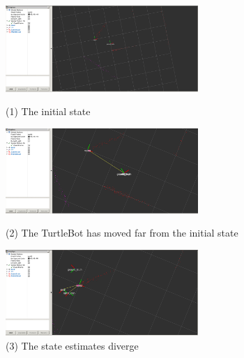 \documentclass{article}
\begin{document}
\begin{enumerate}[label=(\roman*)]
\begin{figure}[H]
    \begin{center}
    \includegraphics[width=0.65\textwidth]{P1_Screenshots/1initial.PNG}
    \caption*{(1) The initial state}
    \includegraphics[width=0.65\textwidth]{P1_Screenshots/2move.PNG}
    \caption*{(2) The TurtleBot has moved far from the initial state}
    \includegraphics[width=0.65\textwidth]{P1_Screenshots/3diverge.PNG}
    \caption*{(3) The state estimates diverge}
    \end{center}
\end{figure}

\end{enumerate}

\newpage
\end{document}
